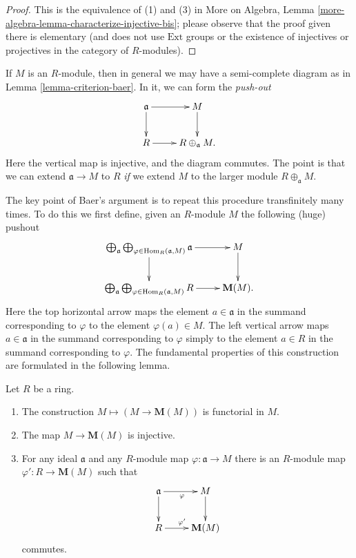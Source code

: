 \begin{proof}
This is the equivalence of (1) and (3) in
More on Algebra, Lemma \ref{more-algebra-lemma-characterize-injective-bis};
please observe that the proof given there is elementary
(and does not use $\text{Ext}$ groups or the existence of injectives
or projectives in the category of $R$-modules).
\end{proof}

\noindent
If $M$ is an $R$-module, then in general we may have a semi-complete
diagram as in
Lemma \ref{lemma-criterion-baer}.
In it, we can form the \emph{push-out}
$$
\xymatrix{
\mathfrak{a} \ar[d]  \ar[r] &  M \ar[d] \\
R \ar[r] &  R \oplus_{\mathfrak{a}} M.
}
$$
Here the vertical map is injective, and the diagram commutes. The point is
that we can extend $\mathfrak{a} \to M$ to $R$ \emph{if} we extend $M$ to the
larger module $R \oplus_{\mathfrak{a}} M$.

\medskip\noindent
The key point of Baer's argument is to repeat this procedure
transfinitely many times. To do this we first define, given an $R$-module
$M$ the following (huge) pushout
\begin{equation}
\label{equation-huge-diagram}
\vcenter{
\xymatrix{
\bigoplus_{\mathfrak a}
\bigoplus_{\varphi \in \Hom_R(\mathfrak a, M)}
\mathfrak{a} \ar[r] \ar[d] & M \ar[d] \\
\bigoplus_{\mathfrak a}
\bigoplus_{\varphi \in \Hom_R(\mathfrak a, M)}
R \ar[r] &  \mathbf{M}(M).
}
}
\end{equation}
Here the top horizontal arrow maps the element $a \in \mathfrak a$
in the summand corresponding to $\varphi$ to the element $\varphi(a) \in M$.
The left vertical arrow maps $a \in \mathfrak a$ in the summand corresponding
to $\varphi$ simply to the element $a \in R$ in the summand corresponding
to $\varphi$. The fundamental properties of this construction are
formulated in the following lemma.

\begin{lemma}
\label{lemma-construction}
Let $R$ be a ring.
\begin{enumerate}
\item The construction $M \mapsto (M \to \mathbf{M}(M))$
is functorial in $M$.
\item The map $M \to \mathbf{M}(M)$ is injective.
\item For any ideal $\mathfrak{a}$ and any $R$-module map
$\varphi : \mathfrak a \to M$ there is an $R$-module map
$\varphi' : R \to \mathbf{M}(M)$ such that
$$
\xymatrix{
\mathfrak{a} \ar[d] \ar[r]_\varphi &  M \ar[d] \\
R \ar[r]^{\varphi'} & \mathbf{M}(M)
}
$$
commutes.
\end{enumerate}
\end{lemma}

